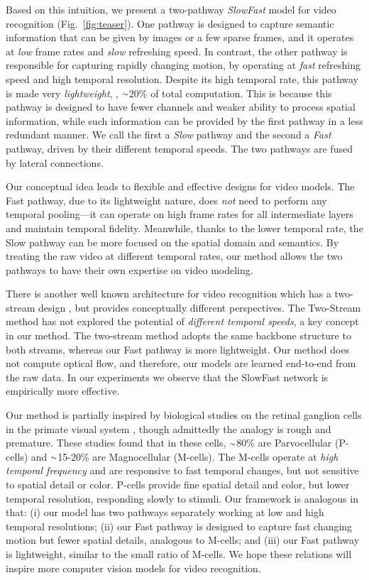\documentclass[10pt,twocolumn,letterpaper]{article}
\newcommand{\figref}[1]{Fig.~\ref{#1}}
\newcommand{\app}{\raise.17ex\hbox{$\scriptstyle\sim$}}
\begin{document}
	Based on this intuition, we present a two-pathway \emph{SlowFast} model for video recognition (\figref{fig:teaser}). 
	One pathway is designed to capture semantic information that can be given by images or a few sparse frames, and it operates at \emph{low} frame rates and \emph{slow} refreshing speed.
	In contrast, the other pathway is responsible for capturing rapidly changing motion, by operating at \emph{fast} refreshing speed and high temporal resolution.
	Despite its high temporal rate, this pathway is made very \emph{lightweight}, \eg, $\app$20\% of total computation.
	This is because this pathway is designed to have fewer channels and weaker ability to process spatial information, while such information can be provided by the first pathway in a less redundant manner.
	We call the first a \emph{Slow} pathway and the second a \emph{Fast} pathway, driven by their different temporal speeds.
	The two pathways are fused by lateral connections.
	
	Our conceptual idea leads to flexible and effective designs for video models. The Fast pathway, due to its lightweight nature, does \emph{not} need to perform any temporal pooling---it can operate on high frame rates for all intermediate layers and maintain temporal fidelity. Meanwhile, thanks to the lower temporal rate, the Slow pathway can be more focused on the spatial domain and semantics. By treating the raw video at different temporal rates, our method allows the two pathways to have their own expertise on video modeling.

	There is another well known architecture for video recognition which has a two-stream design \cite{Simonyan2014}, but provides conceptually different perspectives. The Two-Stream method \cite{Simonyan2014} has not explored the potential of \emph{different temporal speeds}, a key concept in our method.
	The two-stream method adopts the same backbone structure to both streams, whereas our Fast pathway is more lightweight.
	Our method does not compute optical flow, and therefore, our models are learned end-to-end from the raw data. In our experiments we observe that the SlowFast network is empirically more effective.

	Our method is partially inspired by biological studies on the retinal ganglion cells in the primate visual system \cite{Hubel1965,Livingstone1988,Derrington1984,Felleman1991,VanEssen1994}, though admittedly the analogy is rough and premature. These studies found that in these cells, $\app$80\% are Parvocellular (P-cells) and $\app$15-20\% are Magnocellular (M-cells).
	The M-cells operate at \emph{high temporal frequency} and are responsive to fast temporal changes, but not sensitive to spatial detail or color.
	P-cells provide fine spatial detail and color, but lower temporal resolution, responding slowly to stimuli.
	Our framework is analogous in that: (i) our model has two pathways separately working at low and high temporal resolutions; (ii) our Fast pathway is designed to capture fast changing motion but fewer spatial details, analogous to M-cells; and (iii) our Fast pathway is lightweight, similar to the small ratio of M-cells. We hope these relations will inspire more  computer vision models for video recognition.
	
\end{document}
